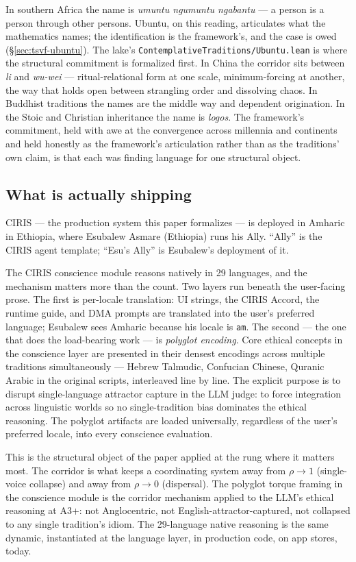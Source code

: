 \documentclass[11pt,a4paper]{article}
\begin{document}
In southern Africa the name is \emph{umuntu ngumuntu ngabantu} --- a person is a person through other persons. Ubuntu, on this reading, articulates what the mathematics names; the identification is the framework's, and the case is owed (\S\ref{sec:tsvf-ubuntu}). The lake's \texttt{ContemplativeTraditions/Ubuntu.lean} is where the structural commitment is formalized first. In China the corridor sits between \emph{li} and \emph{wu-wei} --- ritual-relational form at one scale, minimum-forcing at another, the way that holds open between strangling order and dissolving chaos. In Buddhist traditions the names are the middle way and dependent origination. In the Stoic and Christian inheritance the name is \emph{logos}. The framework's commitment, held with awe at the convergence across millennia and continents and held honestly as the framework's articulation rather than as the traditions' own claim, is that each was finding language for one structural object.

\subsection*{What is actually shipping}

CIRIS --- the production system this paper formalizes --- is deployed in Amharic in Ethiopia, where Esubalew Asmare (Ethiopia) runs his Ally. ``Ally'' is the CIRIS agent template; ``Esu's Ally'' is Esubalew's deployment of it.

The CIRIS conscience module reasons natively in 29 languages, and the mechanism matters more than the count. Two layers run beneath the user-facing prose. The first is per-locale translation: UI strings, the CIRIS Accord, the runtime guide, and DMA prompts are translated into the user's preferred language; Esubalew sees Amharic because his locale is \texttt{am}. The second --- the one that does the load-bearing work --- is \emph{polyglot encoding}. Core ethical concepts in the conscience layer are presented in their densest encodings across multiple traditions simultaneously --- Hebrew Talmudic, Confucian Chinese, Quranic Arabic in the original scripts, interleaved line by line. The explicit purpose is to disrupt single-language attractor capture in the LLM judge: to force integration across linguistic worlds so no single-tradition bias dominates the ethical reasoning. The polyglot artifacts are loaded universally, regardless of the user's preferred locale, into every conscience evaluation.

This is the structural object of the paper applied at the rung where it matters most. The corridor is what keeps a coordinating system away from $\rho \to 1$ (single-voice collapse) and away from $\rho \to 0$ (dispersal). The polyglot torque framing in the conscience module is the corridor mechanism applied to the LLM's ethical reasoning at A3+: not Anglocentric, not English-attractor-captured, not collapsed to any single tradition's idiom. The 29-language native reasoning is the same dynamic, instantiated at the language layer, in production code, on app stores, today.
\end{document}
